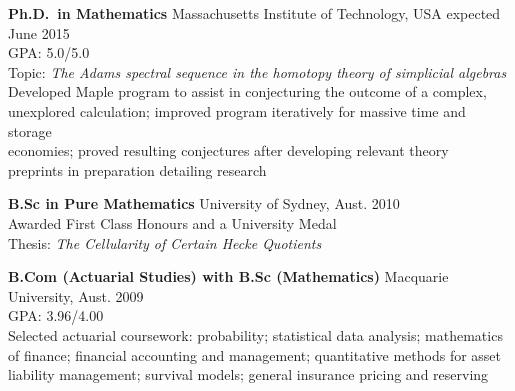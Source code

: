\documentclass[margin,line]{resume}
\newcommand{\dashtab}{\makebox[1cm][r]{$-$ }}
\newcommand{\whitetab}{\makebox[1cm][r]{ }}
\newcommand{\twolineentry}[4]{\textbf{#1} #2 \hfill {#4}\\%
#3
           
\vspace{-3.4mm}}
\newcommand{\FINALtwolineentry}[4]{\textbf{#1} #2 \hfill {#4}\\%
#3\\\vspace{-.55cm}}
\begin{document}
\begin{resume}
\twolineentry{Ph.D.\ in Mathematics}{Massachusetts Institute of Technology, USA}{%
\dashtab GPA: 5.0/5.0\\%
\dashtab Topic: \emph{The Adams spectral sequence in the homotopy theory of simplicial algebras}\\%
\dashtab Developed Maple program to assist in conjecturing the outcome of a complex,\\
\whitetab unexplored calculation; improved program iteratively for massive time and storage\\
\whitetab economies; proved resulting conjectures after  developing relevant theory \\
\dashtab preprints in preparation detailing research
}{expected June 2015}
\twolineentry{B.Sc in Pure Mathematics}{University of Sydney, Aust.}{%
\dashtab Awarded First Class Honours and a University Medal\\
\dashtab Thesis: \emph{The Cellularity of Certain Hecke Quotients}
}{2010}
\FINALtwolineentry{B.Com (Actuarial Studies) with B.Sc (Mathematics)}{Macquarie University, Aust.}{
\dashtab GPA: 3.96/4.00\\
\dashtab Selected actuarial coursework: probability; statistical data analysis; mathematics\\
\whitetab of finance; financial accounting and management; quantitative methods for asset\\
\whitetab liability management; survival models; general insurance pricing and reserving
}{2009}

\end{resume}
\end{document}

